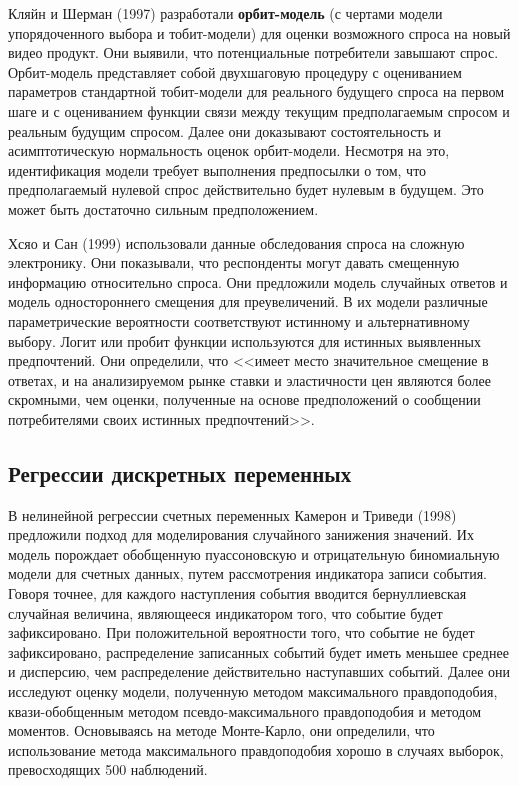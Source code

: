 Кляйн и Шерман (1997) разработали {\bf орбит-модель} (с чертами модели упорядоченного выбора и тобит-модели) для оценки возможного спроса на новый видео продукт. Они выявили, что потенциальные потребители завышают спрос. Орбит-модель представляет собой двухшаговую процедуру с оцениванием параметров стандартной тобит-модели для реального будущего спроса на первом шаге и с оцениванием функции связи между текущим предполагаемым спросом и реальным будущим спросом. Далее они доказывают состоятельность и асимптотическую нормальность оценок орбит-модели. Несмотря на это, идентификация модели требует выполнения предпосылки о том, что предполагаемый нулевой спрос действительно будет нулевым в будущем. Это может быть достаточно сильным предположением.
 
Хсяо и Сан (1999) использовали данные обследования спроса на сложную электронику. Они показывали, что респонденты могут давать смещенную информацию относительно спроса. Они предложили модель случайных ответов и модель одностороннего смещения для преувеличений.  В их модели  различные параметрические вероятности соответствуют истинному и альтернативному выбору.  Логит или пробит функции используются для истинных выявленных предпочтений. Они определили, что <<имеет место значительное смещение в ответах, и на анализируемом рынке ставки и эластичности цен являются более скромными, чем оценки, полученные на основе  предположений о сообщении потребителями своих истинных предпочтений>>.

\subsection*{Регрессии дискретных переменных} 
В нелинейной регрессии счетных переменных Камерон и Триведи (1998) предложили подход для моделирования  случайного занижения значений. Их модель порождает обобщенную пуассоновскую и отрицательную биномиальную модели для счетных данных, путем рассмотрения индикатора записи события.  Говоря точнее, для каждого наступления события вводится бернуллиевская случайная величина, являющееся индикатором того, что событие будет зафиксировано. При положительной вероятности того, что событие не будет зафиксировано,  распределение записанных событий будет иметь меньшее среднее и дисперсию, чем распределение действительно наступавших событий. Далее они исследуют оценку модели, полученную методом максимального правдоподобия, квази-обобщенным методом псевдо-максимального правдоподобия и методом моментов. Основываясь на методе Монте-Карло, они определили, что использование метода максимального правдоподобия хорошо в случаях выборок, превосходящих 500 наблюдений.

